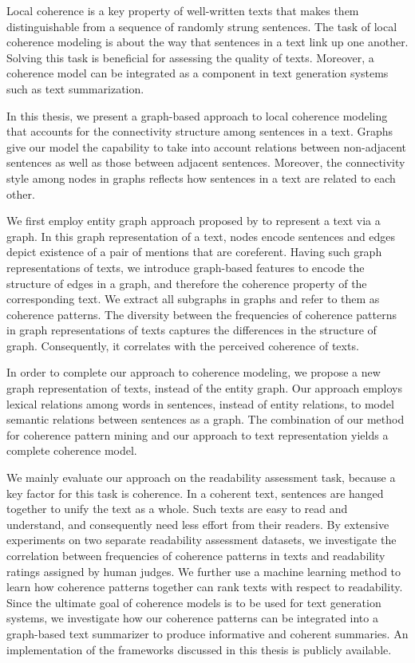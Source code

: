 
\addchap*{\abstractname}

Local coherence is a key property of well-written texts that makes them distinguishable from a sequence of randomly strung sentences. 
The task of local coherence modeling is about the way that sentences in a text link up one another.  
Solving this task is beneficial for assessing the quality of texts. 
Moreover, a coherence model can be integrated as a component in text generation systems such as text summarization. 

In this thesis, we present a graph-based approach to local coherence modeling that accounts for the connectivity structure among sentences in a text. 
Graphs give our model the capability to take into account relations between non-adjacent sentences as well as those between adjacent sentences. 
Moreover, the connectivity style among nodes in graphs reflects how sentences in a text are related to each other. 

We first employ entity graph approach proposed by  to represent a text via a graph. 
In this graph representation of a text, nodes encode sentences and edges depict existence of a pair of mentions that are coreferent.   
Having such graph representations of texts, we introduce graph-based features to encode the structure of edges in a graph, and therefore the coherence property of the corresponding text.   
We extract all subgraphs in graphs and refer to them as coherence patterns. 
The diversity between the frequencies of coherence patterns in graph representations of texts captures the differences in the structure of graph.  
Consequently, it correlates with the perceived coherence of texts.  

In order to complete our approach to coherence modeling, we propose a new graph representation of texts, instead of the entity graph.  
Our approach employs lexical relations among words in sentences, instead of entity relations, to model semantic relations between sentences as a graph. 
The combination of our method for coherence pattern mining and our approach to text representation yields a complete coherence model. 

We mainly evaluate our approach on the readability assessment task, because a key factor for this task is coherence. 
In a coherent text, sentences are hanged together to unify the text as a whole. 
Such texts are easy to read and understand, and consequently need less effort from their readers. 
By extensive experiments on two separate readability assessment datasets, 
we investigate the correlation between frequencies of coherence patterns in texts and readability ratings assigned by human judges.    
We further use a machine learning method to learn how coherence patterns together can rank texts with respect to readability. 
Since the ultimate goal of coherence models is to be used for text generation systems, we investigate how our coherence patterns can be integrated into a graph-based text summarizer to produce informative and coherent summaries. 
An implementation of the frameworks discussed in this thesis is publicly available.

